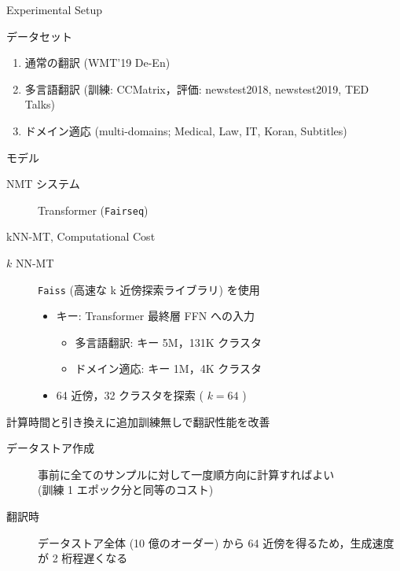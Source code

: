 \documentclass[unicode, 12pt, xdvipdfmx, aspectratio=43]{beamer}
\begin{document}
\begin{frame}[label={sec:orgc7e6d6c}]{Experimental Setup}
\begin{block}{データセット}
\begin{enumerate}
\item 通常の翻訳 (WMT'19 De-En)
\item 多言語翻訳 (訓練: CCMatrix，評価: newstest2018, newstest2019, TED Talks)
\item ドメイン適応 (multi-domains; Medical, Law, IT, Koran, Subtitles)
\end{enumerate}
\end{block}

\begin{block}{モデル}
\begin{description}
\item[{NMT システム}] Transformer (\texttt{Fairseq})
\end{description}
\end{block}
\end{frame}

\begin{frame}[label={sec:org0e475b1}]{kNN-MT, Computational Cost}
\small
\begin{description}
\item[{\(k\) NN-MT}] \texttt{Faiss} (高速な k 近傍探索ライブラリ) を使用
\begin{itemize}
\item キー: Transformer 最終層 FFN への入力
\begin{itemize}
\item 多言語翻訳: キー 5M，131K クラスタ
\item ドメイン適応: キー 1M，4K クラスタ
\end{itemize}
\item 64 近傍，32 クラスタを探索 ( \(k = 64\) )
\end{itemize}
\end{description}

\begin{block}{計算時間と引き換えに追加訓練無しで翻訳性能を改善}
\begin{description}
\item[{データストア作成}] 事前に全てのサンプルに対して一度順方向に計算すればよい \\ (訓練 1 エポック分と同等のコスト)
\item[{翻訳時}] データストア全体 (10 億のオーダー) から 64 近傍を得るため，生成速度が 2 桁程遅くなる
\end{description}
\end{block}
\end{frame}
\end{document}
